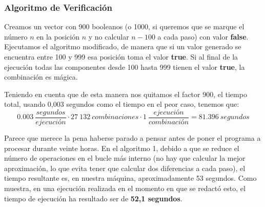 \subsubsection{Algoritmo de Verificación}
Creamos un vector con 900 booleanos (o 1000, si queremos que se marque el número
$n$ en la posición $n$ y no calcular $n-100$ a cada paso) con valor \textbf{false}.
Ejecutamos el algoritmo modificado, de manera que si un valor generado se encuentra
entre 100 y 999 esa posición toma el valor \textbf{true}. Si al final de la
ejecución todas las componentes desde 100 hasta 999 tienen el valor \textbf{true},
la combinación es mágica. 

Teniendo en cuenta que de esta manera nos quitamos el factor 900, el tiempo total,
usando 0,003 segundos como el tiempo en el peor caso, tenemos que:
$$ 0.003\ \frac{segundos}{ejecución} \cdot 27\ 132\ combinaciones \cdot 1\  \frac{ejecución}{combinación}=81.396\ segundos$$

Parece que merece la pena haberse parado a pensar antes de poner el programa a
procesar durante veinte horas. En el algoritmo 1, debido a que se reduce el número
de operaciones en el bucle más interno (no hay que calcular la mejor aproximación,
lo que evita tener que calcular dos diferencias a cada paso), el tiempo resultante
es, en nuestra máquina, aproximadamente 53 segundos. Como muestra,
en una ejecución realizada en el momento en que se redactó esto, el tiempo de
ejecución ha resultado ser de \textbf{52,1 segundos}.